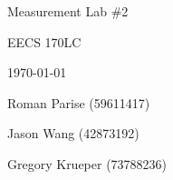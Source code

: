 \centering
\vspace*{5cm}
{\huge Measurement Lab \#2 \par}
{\Large EECS 170LC \par}
{\Large \today \par}
\vspace{1cm}
{\large Roman Parise (59611417) \par}
{\large Jason Wang (42873192) \par}
{\large Gregory Krueper (73788236) \par}
\vspace{1cm}
